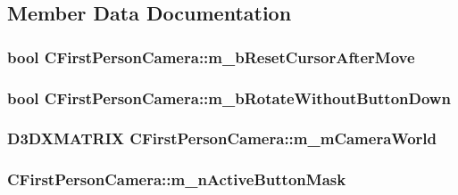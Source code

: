 \subsection{Member Data Documentation}
\hypertarget{class_c_first_person_camera_a94d8d853ab5a68c7138dd6e47ad8b47f}{
\subsubsection[{m\_\-bResetCursorAfterMove}]{\setlength{\rightskip}{0pt plus 5cm}bool {\bf CFirstPersonCamera::m\_\-bResetCursorAfterMove}}}
\label{class_c_first_person_camera_a94d8d853ab5a68c7138dd6e47ad8b47f}
\hypertarget{class_c_first_person_camera_a5fbd2d7347724f3d22c2ff78d9547c52}{
\subsubsection[{m\_\-bRotateWithoutButtonDown}]{\setlength{\rightskip}{0pt plus 5cm}bool {\bf CFirstPersonCamera::m\_\-bRotateWithoutButtonDown}}}
\label{class_c_first_person_camera_a5fbd2d7347724f3d22c2ff78d9547c52}
\hypertarget{class_c_first_person_camera_a4065145f014e4ea76ad27537418fd34e}{
\subsubsection[{m\_\-mCameraWorld}]{\setlength{\rightskip}{0pt plus 5cm}D3DXMATRIX {\bf CFirstPersonCamera::m\_\-mCameraWorld}}}
\label{class_c_first_person_camera_a4065145f014e4ea76ad27537418fd34e}
\hypertarget{class_c_first_person_camera_a443dce2d48aa73eaecffd696eed9bd94}{
\subsubsection[{m\_\-nActiveButtonMask}]{ {\bf CFirstPersonCamera::m\_\-nActiveButtonMask}}}
\label{class_c_first_person_camera_a443dce2d48aa73eaecffd696eed9bd94}


